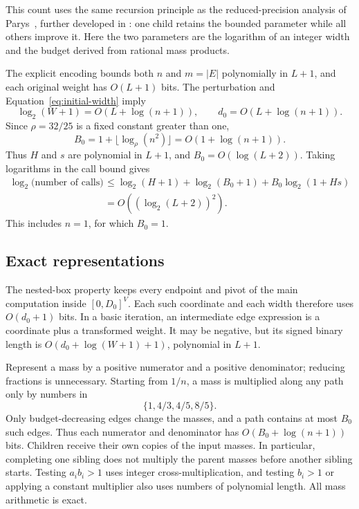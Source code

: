 This count uses the same recursion principle as the reduced-precision
analysis of Parys~\cite[Section~5]{Parys2019}, further developed in
\cite{LehtinenParysScheweWojtczak2022}: one child retains the bounded
parameter while all others improve it. Here the two parameters are
the logarithm of an integer width and the budget derived from rational
mass products.

The explicit encoding bounds both $n$ and $m=|E|$ polynomially in
$L+1$, and each original weight has $O(L+1)$ bits. The perturbation
and Equation~\eqref{eq:initial-width} imply
\[
 \log_2(W+1)=O(L+\log(n+1)),\qquad
 d_0=O(L+\log(n+1)).
\]
Since $\rho=32/25$ is a fixed constant greater than one,
\[
 B_0=1+\lfloor\log_{\rho}(n^2)\rfloor
                          =O(1+\log(n+1)).
\]
Thus $H$ and $s$ are polynomial in $L+1$, and
$B_0=O(\log(L+2))$. Taking logarithms in the call bound gives
\begin{equation}
 \begin{split}
 \log_2\bigl(\text{number of calls}\bigr)
 &\le \log_2(H+1)+\log_2(B_0+1)
                         +B_0\log_2(1+Hs)\\
 &=O((\log_2(L+2))^2).
 \end{split}
 \label{eq:quasipoly-calls}
\end{equation}
This includes $n=1$, for which $B_0=1$.

\subsection{Exact representations}

The nested-box property keeps every endpoint and pivot of the main
computation inside $[0,D_0]^V$. Each such coordinate and each width
therefore uses $O(d_0+1)$ bits. In a basic iteration, an intermediate
edge expression is a coordinate plus a transformed weight. It may be
negative, but its signed binary length is
$O(d_0+\log(W+1)+1)$, polynomial in $L+1$.

Represent a mass by a positive numerator and a positive denominator;
reducing fractions is unnecessary. Starting from $1/n$, a mass is
multiplied along any path only by numbers in
\[
                           \{1,4/3,4/5,8/5\}.
\]
Only budget-decreasing edges change the masses, and a path contains
at most $B_0$ such edges. Thus each numerator and denominator has
$O(B_0+\log(n+1))$ bits. Children receive their own copies of the
input masses. In particular, completing one sibling does not multiply
the parent masses before another sibling starts. Testing $a_i b_i>1$
uses integer cross-multiplication, and testing $b_i>1$ or applying a
constant multiplier also uses numbers of polynomial length. All mass
arithmetic is exact.

